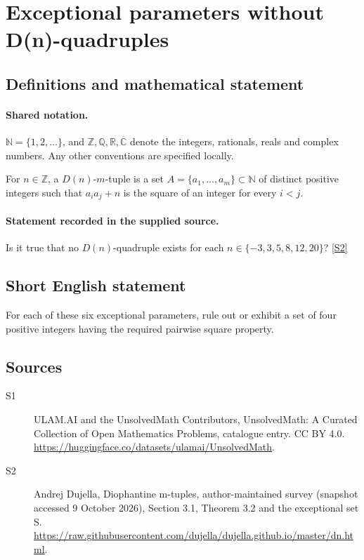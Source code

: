 \documentclass[11pt]{article}
\newcommand{\sref}[2]{\hyperlink{source:#1:#2}{[S#2]}}
\begin{document}
\section{Exceptional parameters without D(n)-quadruples}\label{statement}

\subsection{Definitions and mathematical statement}

\paragraph{Shared notation.}$\mathbb N=\{1,2,\ldots\}$, and $\mathbb Z,\mathbb Q,\mathbb R,\mathbb C$ denote the integers, rationals, reals and complex numbers. Any other conventions are specified locally.


For $n\in\mathbb Z$, a $D(n)$-$m$-tuple is a set $A=\{a_1,\ldots,a_m\}\subset\mathbb N$ of distinct positive integers such that $a_i a_j+n$ is the square of an integer for every $i<j$.
\paragraph{Statement recorded in the supplied source.}
Is it true that no $D(n)$-quadruple exists for each $n\in\{-3,3,5,8,12,20\}$? \sref{statement}{2}
\subsection{Short English statement}
For each of these six exceptional parameters, rule out or exhibit a set of four positive integers having the required pairwise square property.
\subsection{Sources}
\begin{description}
\item[\hypertarget{source:statement:1}{S1}] ULAM.AI and the UnsolvedMath Contributors, UnsolvedMath: A Curated Collection of Open Mathematics Problems, catalogue entry. CC BY 4.0. \url{https://huggingface.co/datasets/ulamai/UnsolvedMath}.
\item[\hypertarget{source:statement:2}{S2}] Andrej Dujella, Diophantine m-tuples, author-maintained survey (snapshot accessed 9 October 2026), Section 3.1, Theorem 3.2 and the exceptional set S. \url{https://raw.githubusercontent.com/dujella/dujella.github.io/master/dn.html}.
\end{description}
\label{end:statement}
\end{document}
